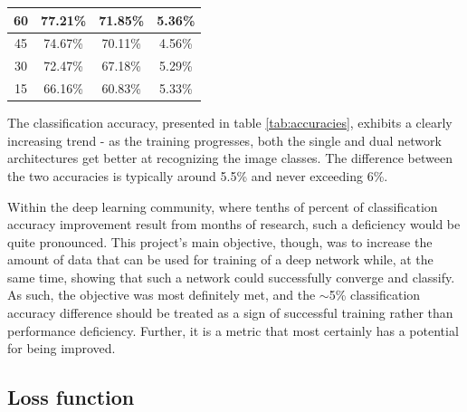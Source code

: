 \documentclass[a4paper, 12pt]{article}
\numberwithin{equation}{section}
\begin{document}
\begin{table}[ht!]
\begin{tabular}{|c|c|c|c|}
			60                                                         & 77.21\%                                                           & 71.85\%                                                         & 5.36\%                                                                           \\ \hline
			45                                                         & 74.67\%                                                           & 70.11\%                                                         & 4.56\%                                                                           \\ \hline
			30                                                        & 72.47\%                                                           & 67.18\%                                                         & 5.29\%                                                                           \\ \hline
			15                                                        & 66.16\%                                                           & 60.83\%                                                         & 5.33\%                                                                           \\ \hline
		\end{tabular}
	\end{table}

	The classification accuracy, presented in table \ref{tab:accuracies}, exhibits a clearly increasing trend - as the training progresses, both the single and dual network architectures get better at recognizing the image classes. The difference between the two accuracies is typically around 5.5\% and never exceeding 6\%.

	Within the deep learning community, where tenths of percent of classification accuracy improvement result from months of research, such a deficiency would be quite pronounced. This project's main objective, though, was to increase the amount of data that can be used for training of a deep network while, at the same time, showing that such a network could successfully converge and classify. As such, the objective was most definitely met, and the $\mathtt{\sim}$5\% classification accuracy difference should be treated as a sign of successful training rather than performance deficiency. Further, it is a metric that most certainly has a potential for being improved.

	\subsection{Loss function}
\end{document}
